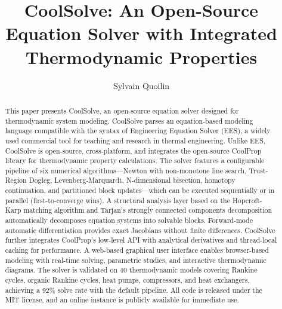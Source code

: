\documentclass[review,3p]{elsarticle}
\begin{document}
\begin{frontmatter}

\title{CoolSolve: An Open-Source Equation Solver with Integrated Thermodynamic Properties}

\author[uliege]{Sylvain Quoilin}
\address[uliege]{Thermodynamics Laboratory, Faculty of Applied Sciences,
  All\'ee de la D\'ecouverte 17, 4000 Li\`ege, Belgium}


\begin{abstract}
This paper presents CoolSolve, an open-source equation solver designed for thermodynamic system modeling. CoolSolve parses an equation-based modeling language compatible with the syntax of Engineering Equation Solver (EES), a widely used commercial tool for teaching and research in thermal engineering. Unlike EES, CoolSolve is open-source, cross-platform, and integrates the open-source CoolProp library for thermodynamic property calculations. The solver features a configurable pipeline of six numerical algorithms---Newton with non-monotone line search, Trust-Region Dogleg, Levenberg-Marquardt, N-dimensional bisection, homotopy continuation, and partitioned block updates---which can be executed sequentially or in parallel (first-to-converge wins). A structural analysis layer based on the Hopcroft-Karp matching algorithm and Tarjan's strongly connected components decomposition automatically decomposes equation systems into solvable blocks. Forward-mode automatic differentiation provides exact Jacobians without finite differences. CoolSolve further integrates CoolProp's low-level API with analytical derivatives and thread-local caching for performance. A web-based graphical user interface enables browser-based modeling with real-time solving, parametric studies, and interactive thermodynamic diagrams. The solver is validated on 40 thermodynamic models covering Rankine cycles, organic Rankine cycles, heat pumps, compressors, and heat exchangers, achieving a 92\% solve rate with the default pipeline. All code is released under the MIT license, and an online instance is publicly available for immediate use.
\end{abstract}


\end{frontmatter}
\end{document}
